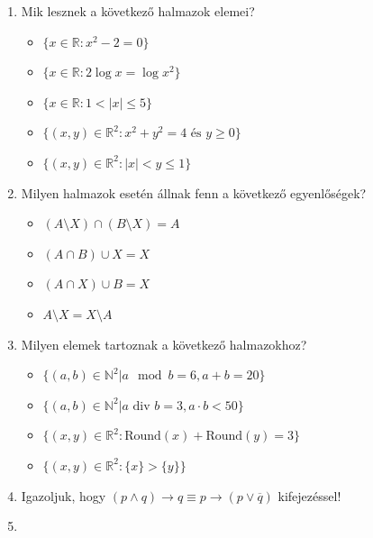 \documentclass[a4paper]{article}
\begin{document}
\begin{enumerate}

\item

Mik lesznek a következő halmazok elemei?

\begin{itemize}
    \item $\{x \in \mathbb{R} : x^2 - 2 = 0\}$
    \item $\{x \in \mathbb{R} : 2\log x = \log x^2\}$
    \item $\{x \in \mathbb{R} : 1 < |x| \leq 5\}$
    \item $\{(x, y) \in \mathbb{R}^2 : x^2 + y^2 = 4 \text{ és } y \geq 0\}$
    \item $\{(x, y) \in \mathbb{R}^2 : |x| < y \leq 1\}$
\end{itemize}

\item

Milyen halmazok esetén állnak fenn a következő egyenlőségek?

\begin{itemize}
    \item $(A \setminus X) \cap (B \setminus X) = A$
    \item $(A \cap B) \cup X = X$
    \item $(A \cap X) \cup B = X$
    \item $A \setminus X = X \setminus A$
\end{itemize}

\item

Milyen elemek tartoznak a következő halmazokhoz?

\begin{itemize}
    \item $\{(a, b) \in \mathbb{N}^2 | a \mod b = 6, a + b = 20\}$
    \item $\{(a, b) \in \mathbb{N}^2 | a \text{ div } b = 3, a \cdot b < 50\}$
    \item $\{(x, y) \in \mathbb{R}^2 : \text{Round}(x) + \text{Round}(y) = 3\}$
    \item $\{(x, y) \in \mathbb{R}^2 : \{x\} > \{y\}\}$
\end{itemize}

\item

Igazoljuk, hogy $(p \wedge q) \rightarrow q \equiv p \rightarrow (p \vee \overline{q})$ kifejezéssel!

\item


\end{enumerate}
\end{document}
